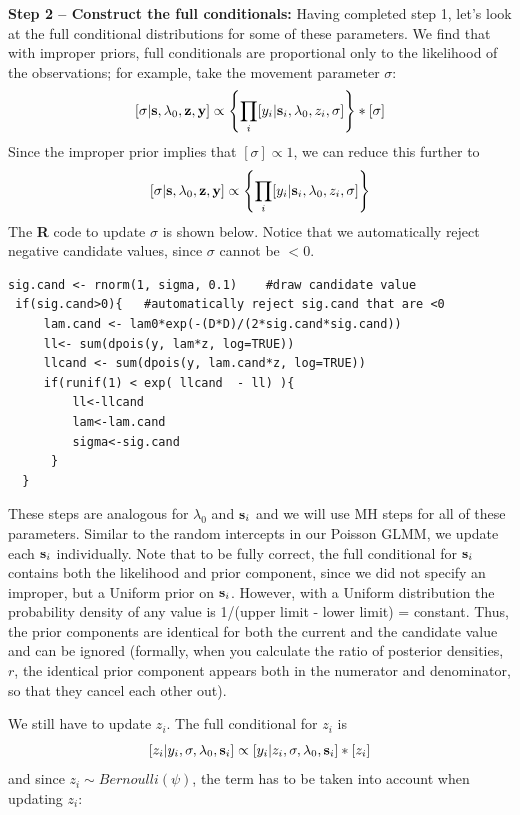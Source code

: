 {\bf Step 2 -- Construct the full conditionals:}
Having completed step 1, let's look at the full conditional distributions for some of these parameters.
We find that with improper priors, full conditionals are proportional only to the likelihood of the observations; for example, take the movement parameter $\sigma$:
\[
[\sigma|{\bf s}, \lambda_{0}, {\bf z}, {\bf y}] \propto \left\{ \prod_{i} [y_{i}| {\bf
    s}_{i}, \lambda_{0}, z_{i}, \sigma] \right\} * [\sigma]
\]
Since the improper prior implies that $[\sigma] \propto 1$, we can reduce this further to
\[
[\sigma|{\bf s}, \lambda_{0}, {\bf z}, {\bf y}] \propto \left\{
  \prod_{i} [y_{i}| {\bf s}_{i}, \lambda_{0}, z_{i}, \sigma] \right\}
\]
The {\bf R} code to update $\sigma$ is shown below.
Notice that we automatically reject negative candidate values, since $\sigma$ cannot be $<0$.  

\begin{verbatim}
sig.cand <- rnorm(1, sigma, 0.1)	#draw candidate value
 if(sig.cand>0){   #automatically reject sig.cand that are <0
     lam.cand <- lam0*exp(-(D*D)/(2*sig.cand*sig.cand))
     ll<- sum(dpois(y, lam*z, log=TRUE))
     llcand <- sum(dpois(y, lam.cand*z, log=TRUE))
     if(runif(1) < exp( llcand  - ll) ){
         ll<-llcand
         lam<-lam.cand
         sigma<-sig.cand
      }
  }
\end{verbatim}

These steps are analogous for  $\lambda_{0}$ and ${\bf s}_i$ and we will 
use MH steps for
all of these parameters. Similar to the random intercepts in our
Poisson GLMM, we update each ${\bf s}_i$ individually. Note that to be fully
correct, the full conditional for ${\bf s}_i$ contains both the likelihood and
prior component, since we did not specify an improper, but a Uniform
prior on ${\bf s}_i$. However, with a Uniform distribution the probability
density of any value is 1/(upper limit - lower limit) =
constant. Thus, the prior components are identical for both the
current and the candidate value and can be ignored (formally, when you
calculate the ratio of posterior densities, $r$, the identical prior
component appears both in the numerator and denominator, so that they
cancel each other out).

We still have to update $z_i$. The full conditional for $z_i$ is
\[
[z_i|y_{i}, \sigma, \lambda_0, {\bf s}_{i}] \propto [y_{i}|z_{i},\sigma, \lambda_0, 
{\bf s}_{i}] * [z_i]
\]
and since $z_i \sim Bernoulli(\psi)$,
the term has to be taken into account when updating $z_i$:

